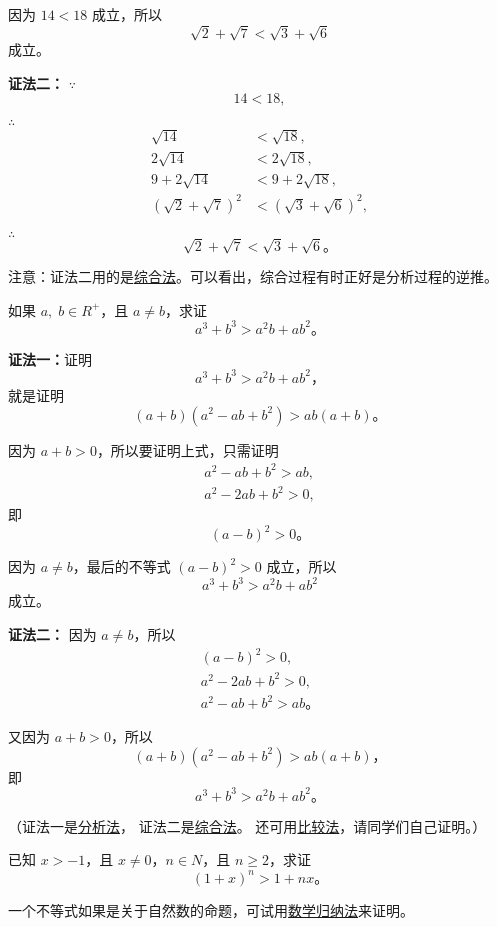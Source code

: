 因为 $14 < 18$ 成立，所以
$$ \sqrt{2} + \sqrt{7} < \sqrt{3} + \sqrt{6} $$
成立。


\textbf{证法二：} \quad $\because$
\shangyihang $$ 14 < 18, $$

$\therefore$
\shangyihang \begin{align*}
     \sqrt{14} &< \sqrt{18}, \\
    2\sqrt{14} &< 2\sqrt{18}, \\
    9 + 2\sqrt{14} &<  9 + 2\sqrt{18}, \\
    (\sqrt{2} + \sqrt{7})^2 &< (\sqrt{3} + \sqrt{6})^2,
\end{align*}

$\therefore$
\shangyihang $$ \sqrt{2} + \sqrt{7} < \sqrt{3} + \sqrt{6} \text{。} $$

注意：证法二用的是\hyperref[def:zonghefa]{综合法}。可以看出，综合过程有时正好是分析过程的逆推。

\liti 如果 $a,\; b \in R^+$，且 $a \neq b$，求证
$$ a^3 + b^3 > a^2b + ab^2 \text{。} $$

\textbf{证法一：}证明
$$ a^3 + b^3 > a^2b + ab^2 \text{，} $$
就是证明
$$ (a + b)(a^2 -ab + b^2) > ab(a + b) \text{。} $$

因为 $a + b > 0$，所以要证明上式，只需证明
\begin{align*}
    a^2 - ab + b^2 > ab, \\
    a^2 - 2ab + b^2 > 0,
\end{align*}
即
$$ (a - b)^2 > 0 \text{。} $$

因为 $a \neq b$，最后的不等式 $(a - b)^2 > 0$ 成立，所以
$$ a^3 + b^3 > a^2b + ab^2 $$
成立。

\textbf{证法二：} 因为 $a \neq b$，所以
\begin{gather*}
    (a - b)^2 > 0, \\
    a^2 - 2ab + b^2 > 0, \\
    a^2 - ab + b^2 > ab \text{。}
\end{gather*}

又因为 $a + b > 0$，所以
$$ (a + b)(a^2 - ab + b^2) > ab(a + b) \text{，} $$
即
$$ a^3 + b^3 > a^2b + ab^2 \text{。} $$

（证法一是\hyperref[def:fenxifa]{分析法}，
证法二是\hyperref[def:zonghefa]{综合法}。
还可用\hyperref[def:bijiaofa]{比较法}，请同学们自己证明。）

\liti 已知 $x > -1$，且 $x \neq 0$，$n \in N$，且 $n \geqslant 2$，求证
$$ (1 + x)^n > 1 + nx \text{。} $$

一个不等式如果是关于自然数的命题，可试用\hyperref[subsec:2-4]{数学归纳法}来证明。

